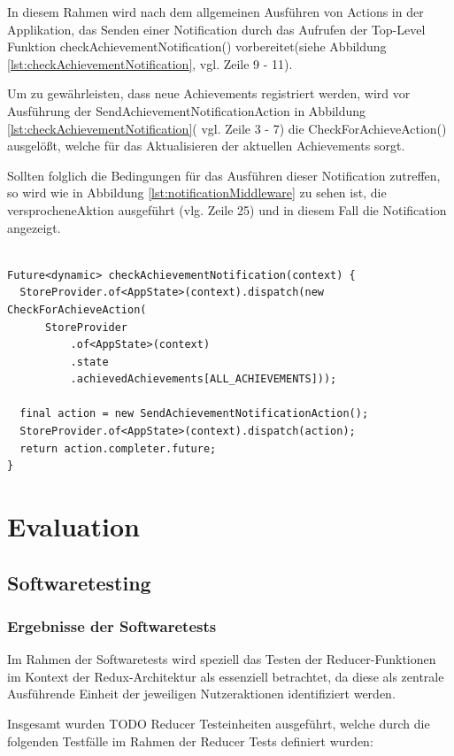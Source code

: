 \documentclass[bibliography=totoc,listof=totoc,BCOR=5mm,DIV=12,oneside]{scrbook}
\begin{document}
\par In diesem Rahmen wird nach dem allgemeinen Ausführen von Actions in der Applikation, das Senden einer Notification durch das Aufrufen der Top-Level Funktion checkAchievementNotification() \grqq vorbereitet\grqq (siehe Abbildung \ref{lst:checkAchievementNotification}, vgl. Zeile  9 - 11).
\par \medskip Um zu gewährleisten, dass neue Achievements registriert werden, wird vor Ausführung der SendAchievementNotificationAction in Abbildung \ref{lst:checkAchievementNotification}( vgl. Zeile 3 - 7) die CheckForAchieveAction() ausgelößt, welche für das Aktualisieren der aktuellen Achievements sorgt.
\par \medskip Sollten folglich die Bedingungen für das Ausführen dieser Notification zutreffen, so wird wie in Abbildung \ref{lst:notificationMiddleware} zu sehen ist, die \grqq versprochene\grqq Aktion ausgeführt (vlg. Zeile 25) und in diesem Fall die Notification angezeigt. 

\bigskip
\begin{lstlisting}[caption={checkAchievementNotification Methode},captionpos=b, label=lst:checkAchievementNotification]

Future<dynamic> checkAchievementNotification(context) {
  StoreProvider.of<AppState>(context).dispatch(new CheckForAchieveAction(
      StoreProvider
          .of<AppState>(context)
          .state
          .achievedAchievements[ALL_ACHIEVEMENTS]));

  final action = new SendAchievementNotificationAction();
  StoreProvider.of<AppState>(context).dispatch(action);
  return action.completer.future;
}
\end{lstlisting}
\bigskip

\chapter{Evaluation} \label{chap:nachweisführung}
\section{Softwaretesting}
\subsection{Ergebnisse der Softwaretests}
\par Im Rahmen der Softwaretests wird speziell das Testen der Reducer-Funktionen im Kontext der Redux-Architektur als essenziell betrachtet, da diese als zentrale Ausführende Einheit der jeweiligen Nutzeraktionen identifiziert werden.
\par \bigskip Insgesamt wurden TODO Reducer Testeinheiten ausgeführt, welche durch die folgenden Testfälle im Rahmen der Reducer Tests definiert wurden: 
\end{document}
